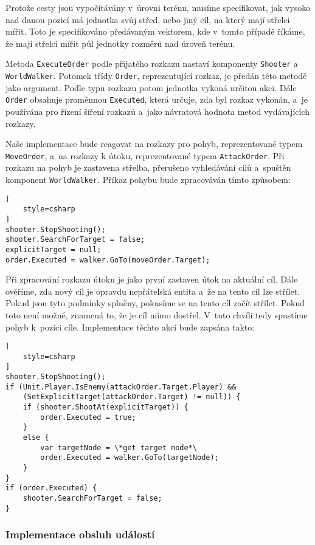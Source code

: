 Protože cesty jsou vypočítávány v~úrovni terénu, musíme specifikovat, jak vysoko nad danou pozicí má jednotka svůj střed, nebo jiný cíl, na který mají střelci mířit. Toto je specifikováno předávaným vektorem, kde v~tomto případě říkáme, že mají střelci mířit půl jednotky rozměrů nad úroveň terénu.

Metoda \texttt{ExecuteOrder} podle přijatého rozkazu nastaví komponenty \texttt{Shooter} a \texttt{WorldWalker}. Potomek třídy \texttt{Order}, reprezentující rozkaz, je předán této metodě jako argument. Podle typu rozkazu potom jednotka vykoná určitou akci. Dále \texttt{Order} obsahuje proměnnou \texttt{Executed}, která určuje, zda byl rozkaz vykonán, a~je používána pro řízení šíření rozkazů a~jako návratová hodnota metod vydávajících rozkazy. 

Naše implementace bude reagovat na rozkazy pro pohyb, reprezentované typem \texttt{MoveOrder}, a~na rozkazy k útoku, reprezentované typem \texttt{AttackOrder}. Při rozkazu na pohyb je zastavena střelba, přerušeno vyhledávání cílů a~spuštěn komponent \texttt{WorldWalker}. Příkaz pohybu bude zpracováván tímto způsobem:
\begin{lstlisting}[
	style=csharp
]
shooter.StopShooting();
shooter.SearchForTarget = false;
explicitTarget = null;
order.Executed = walker.GoTo(moveOrder.Target);
\end{lstlisting}

Při zpracování rozkazu útoku je jako první zastaven útok na aktuální cíl. Dále ověříme, zda nový cíl je opravdu nepřátelská entita a~že na tento cíl lze střílet. Pokud jsou tyto podmínky splněny, pokusíme se na tento cíl začít střílet. Pokud toto není možné, znamená to, že je cíl mimo dostřel. V~tuto chvíli tedy spustíme pohyb k~pozici cíle. Implementace těchto akcí bude zapsána takto:
\begin{lstlisting}[
	style=csharp
]
shooter.StopShooting();
if (Unit.Player.IsEnemy(attackOrder.Target.Player) && 
	(SetExplicitTarget(attackOrder.Target) != null)) {
	if (shooter.ShootAt(explicitTarget)) {
		order.Executed = true;
	}
	else {
		var targetNode = \*get target node*\ 
		order.Executed = walker.GoTo(targetNode);
	} 
}
if (order.Executed) {
	shooter.SearchForTarget = false;
}
\end{lstlisting}

\subsubsection{Implementace obsluh událostí}
\label{sec:eventhandlers}

